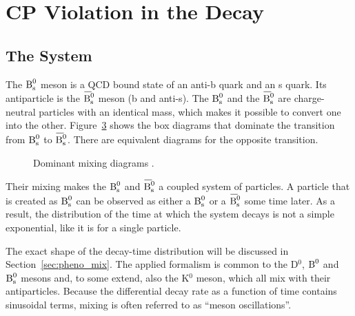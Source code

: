 \section{CP Violation in the \texorpdfstring{\BstoJpsiphi{}}{Bs0->Jpsiphi} Decay}
\label{sec:intro_Jpsiphi}

\subsection{The \texorpdfstring{\BsBsbar{}}{Bs0-Bs0bar} System}
\label{subsec:intro_Jpsiphi_Bs}

The $\text{B}_\text{s}^0$ meson is a QCD bound state of an anti-b quark and an s quark. Its antiparticle is the $\Bsbar$ meson (b and anti-s). The $\text{B}_\text{s}^0$
and the $\Bsbar$ are charge-neutral particles with an identical mass, which makes it possible to convert one into the other.
Figure~\ref{fig:mixing} shows the box diagrams that dominate the transition from $\text{B}_\text{s}^0$ to $\Bsbar$. There are equivalent diagrams for the
opposite transition.
\begin{figure}[hbt]
  \centering
  \begin{subfigure}{0.5\textwidth}
    \centering
    
    \label{fig:mixing_1}
  \end{subfigure}%
  \begin{subfigure}{0.5\textwidth}
    \centering
    
    \label{fig:mixing_2}
  \end{subfigure}
  \caption{Dominant \BsBsbar{} mixing diagrams \cite{LHCb-PAPER-2013-002}.}
  \label{fig:mixing}
\end{figure}

Their mixing makes the $\text{B}_\text{s}^0$ and $\Bsbar$ a coupled system of particles. A particle that is created as $\text{B}_\text{s}^0$ can be observed as either a
$\text{B}_\text{s}^0$ or a $\Bsbar$ some time later. As a result, the distribution of the time at which the \BsBsbar{} system decays is not a simple
exponential, like it is for a single particle.

The exact shape of the decay-time distribution will be discussed in Section~\ref{sec:pheno_mix}. The applied formalism is common to the
D$^0$, $\text{B}^0$ and $\text{B}_\text{s}^0$ mesons and, to some extend, also the K$^0$ meson, which all mix with their antiparticles. Because the differential
decay rate as a function of time contains sinusoidal terms, mixing is often referred to as ``meson oscillations''.

